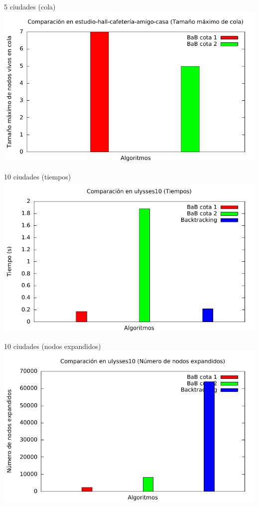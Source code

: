 \begin{frame}{5 ciudades (cola)}
\includegraphics[width=\textwidth]{img/barras_e-h-c-a-c5_cola}
\end{frame}

\begin{frame}{10 ciudades (tiempos)}
\includegraphics[width=\textwidth]{img/barras_ulysses10_t}
\end{frame}

\begin{frame}{10 ciudades (nodos expandidos)}
\includegraphics[width=\textwidth]{img/barras_ulysses10_nodos}
\end{frame}

